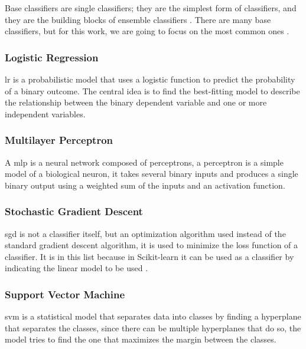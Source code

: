 Base classifiers are single classifiers; 
they are the simplest form of classifiers, and they are the building blocks of ensemble classifiers \cite{oza_classifier_2008}. There are many base classifiers, but for this work, we are going to focus on the most common ones \cite{gong_top_2022}.


\subsubsection{Logistic Regression}
\ac{lr} is a probabilistic model that uses a logistic function to predict the probability of a binary outcome. The central idea is to find the best-fitting model to describe the relationship between the binary dependent variable and one or more independent variables.

\subsubsection{Multilayer Perceptron}
A \ac{mlp} is a neural network composed of perceptrons, a perceptron is a simple model of a biological neuron, it takes several binary inputs and produces a single binary output using a weighted sum of the inputs and an activation function.

\subsubsection{Stochastic Gradient Descent}
\ac{sgd} is not a classifier itself, but an optimization algorithm used instead of the standard gradient descent algorithm, it is used to minimize the loss function of a classifier. It is in this list because in Scikit-learn it can be used as a classifier by indicating the linear model to be used \cite{noauthor_sklearnlinear_modelsgdclassifier_nodate}.

\subsubsection{Support Vector Machine}
\ac{svm} is a statistical model that separates data into classes by finding a hyperplane that separates the classes, since there can be multiple hyperplanes that do so, the model tries to find the one that maximizes the margin between the classes.

